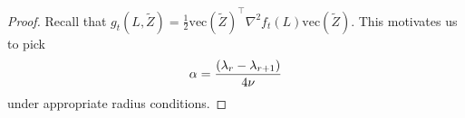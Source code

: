 \documentclass[11pt]{article}
\newcommand{\nb}[1]{\textcolor{orange}{\texttt{[#1]}}}
\newcommand{\gsc}[1]{\textcolor{blue}{\texttt{[#1]}}}
\newcommand{\rev}[1]{\textcolor{black}{#1}}
\newcommand{\hs}{s'}
\newcommand{\0}{{\mathbf{0}}}
\newcommand{\ve}{{\mathrm{vec}}}
\newcommand{\tZ}{{\widetilde{Z}}}
\begin{document}
\begin{proof}
\iffalse Here we want to make a comment on the last inequality that since we are restricting to a set of size at most $3\hs$, we can work on the event that the sample generalized eigenvalue are close enough to the population generalized eigenvalue. In fact we can always appeal to Wely's Theorem for this statement and this ensures the correctness of the last step. However, in view of the logic for the whole proof, once we are on event $B_2$ all the proofs are in a deterministic fashion.\fi 

Recall that $g_t(L,\tZ)=\frac{1}{2}\ve(\tZ)^\top\nabla^2f_t(L) \ve(\tZ)$. 
This motivates us to pick 
\begin{equation*}
\alpha = \frac{(\lambda_r-\lambda_{r+1})}{4\rev{\nu}}
\end{equation*} 
under appropriate radius conditions. 


\end{proof}
\end{document}
